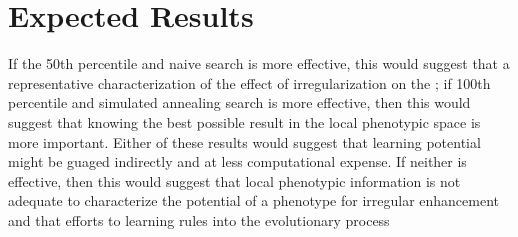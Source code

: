 \section{Expected Results}
If the 50th percentile and naive search is more effective, this would suggest that a representative characterization of the effect of irregularization on the ; if 100th percentile and simulated annealing search is more effective, then this would suggest that knowing the best possible result in the local phenotypic space is more important. Either of these results would suggest that learning potential might be guaged indirectly and at less computational expense. If neither is effective, then this would suggest that local phenotypic information is not adequate to characterize the potential of a phenotype for irregular enhancement and that efforts to learning rules into the evolutionary process